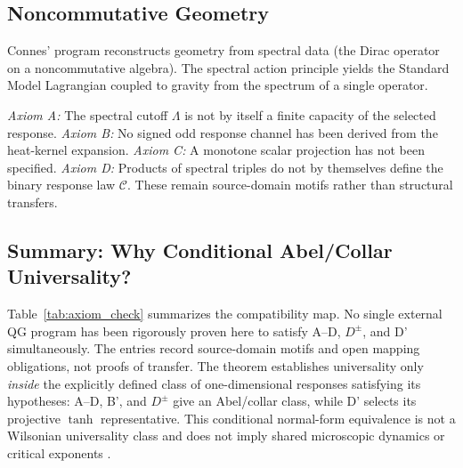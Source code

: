 \documentclass[aps,prd,twocolumn,superscriptaddress,nofootinbib]{revtex4-2}
\begin{document}
\subsection{Noncommutative Geometry}

Connes' program \cite{Connes1994} reconstructs geometry from spectral data (the Dirac operator on a noncommutative algebra). The spectral action principle yields the Standard Model Lagrangian coupled to gravity from the spectrum of a single operator.

\textit{Axiom A:} The spectral cutoff $\Lambda$ is not by itself a finite capacity of the selected response. \textit{Axiom B:} No signed odd response channel has been derived from the heat-kernel expansion. \textit{Axiom C:} A monotone scalar projection has not been specified. \textit{Axiom D:} Products of spectral triples do not by themselves define the binary response law $\mathcal C$. These remain source-domain motifs rather than structural transfers.

\subsection{Summary: Why Conditional Abel/Collar Universality?}

Table~\ref{tab:axiom_check} summarizes the compatibility map. No single external QG program has been rigorously proven here to satisfy A--D, $D^\pm$, and D' simultaneously. The entries record source-domain motifs and open mapping obligations, not proofs of transfer. The theorem establishes universality only \emph{inside} the explicitly defined class of one-dimensional responses satisfying its hypotheses: A--D, B', and $D^\pm$ give an Abel/collar class, while D' selects its projective $\tanh$ representative. This conditional normal-form equivalence is not a Wilsonian universality class and does not imply shared microscopic dynamics or critical exponents \cite{WilsonKogut1974}.
\end{document}
